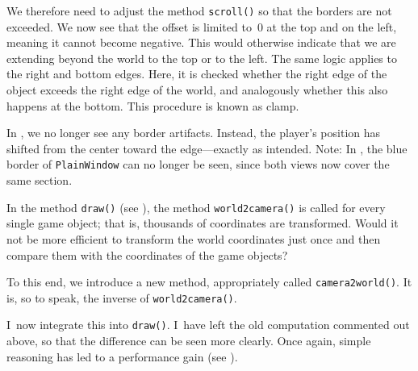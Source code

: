 We therefore need to adjust the method \texttt{scroll()} so that the borders are not exceeded. We now see that the offset is limited to~0 at the top and on the left, meaning it cannot become negative. This would otherwise indicate that we are extending beyond the world to the top or to the left. The same logic applies to the right and bottom edges. Here, it is checked whether the right edge of the object exceeds the right edge of the world, and analogously whether this also happens at the bottom. This procedure is known as \gls{clamp}.

\newpage
{}

In , we no longer see any border artifacts.  
Instead, the player’s position has shifted from the center toward the edge—exactly as intended.  
Note: In , the blue border of \texttt{PlainWindow} can no longer be seen, since both views now cover the same section.


\begin{warningbox}
	In the method \texttt{draw()} (see ), the method \texttt{world2camera()} is called for every single game object; that is, thousands of coordinates are transformed. Would it not be more efficient to transform the world coordinates just once and then compare them with the coordinates of the game objects?
\end{warningbox}

To this end, we introduce a new method, appropriately called \texttt{camera2world()}. It is, so to speak, the inverse of \texttt{world2camera()}.


I~now integrate this into \texttt{draw()}. I~have left the old computation commented out above, so that the difference can be seen more clearly. Once again, simple reasoning has led to a performance gain (see ).

